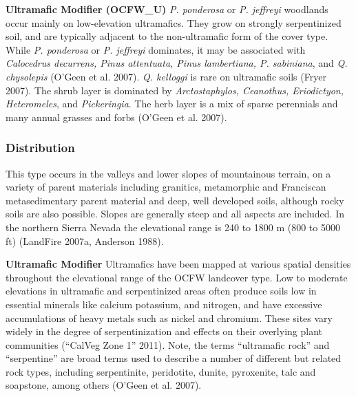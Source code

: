 \begin{adjustwidth}{2cm}{}

\textbf{Ultramafic Modifier (OCFW\_U)}  \emph{P. ponderosa} or \emph{P. jeffreyi} woodlands occur mainly on low-elevation ultramafics. They grow on strongly serpentinized soil, and are typically adjacent to the non-ultramafic form of the cover type. While \emph{P. ponderosa} or \emph{P. jeffreyi} dominates, it may be associated with \emph{Calocedrus decurrens, Pinus attentuata, Pinus lambertiana, P. sabiniana}, and \emph{Q. chysolepis} (O'Geen et al. 2007). \emph{Q. kelloggi} is rare on ultramafic soils (Fryer 2007). The shrub layer is dominated by \emph{Arctostaphylos, Ceanothus, Eriodictyon, Heteromeles}, and \emph{Pickeringia}. The herb layer is a mix of sparse perennials and many annual grasses and forbs (O'Geen et al. 2007). 

\end{adjustwidth}


\subsubsection{Distribution}
This type occurs in the valleys and lower slopes of mountainous terrain, on a variety of parent materials including granitics, metamorphic and Franciscan metasedimentary parent material and deep, well developed soils, although rocky soils are also possible. Slopes are generally steep and all aspects are included. In the northern Sierra Nevada the elevational range is 240 to 1800 m (800 to 5000 ft) (LandFire 2007a, Anderson 1988).

\begin{adjustwidth}{2cm}{}

\textbf{Ultramafic Modifier} Ultramafics have been mapped at various spatial densities throughout the elevational range of the OCFW landcover type. Low to moderate elevations in ultramafic and serpentinized areas often produce soils low in essential minerals like calcium potassium, and nitrogen, and have excessive accumulations of heavy metals such as nickel and chromium. These sites vary widely in the degree of serpentinization and effects on their overlying plant communities (``CalVeg Zone 1'' 2011). Note, the terms ``ultramafic rock'' and ``serpentine'' are broad terms used to describe a number of different but related rock types, including serpentinite, peridotite, dunite, pyroxenite, talc and soapstone, among others (O'Geen et al. 2007).


\end{adjustwidth}

